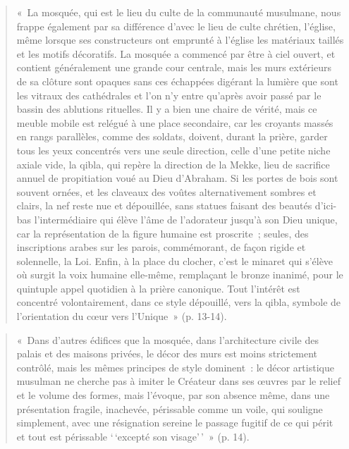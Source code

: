 \begin{quote}
    

«~La mosquée, qui est le lieu du culte de la communauté musulmane, nous
frappe également par sa différence d'avec le lieu de culte chrétien,
l'église, même lorsque ses constructeurs ont emprunté à l'église les
matériaux taillés et les motifs décoratifs. La mosquée a commencé par
être à ciel ouvert, et contient généralement une grande cour centrale,
mais les murs extérieurs de sa clôture sont opaques sans ces échappées
digérant la lumière que sont les vitraux des cathédrales et l'on n'y
entre qu'après avoir passé par le bassin des ablutions rituelles. Il y a
bien une chaire de vérité, mais ce meuble mobile est relégué à une place
secondaire, car les croyants massés en rangs parallèles, comme des
soldats, doivent, durant la prière, garder tous les yeux concentrés vers
une seule direction, celle d'une petite niche axiale vide, la qibla, qui
repère la direction de la Mekke, lieu de sacrifice annuel de
propitiation voué au Dieu d'Abraham. Si les portes de bois sont souvent
ornées, et les claveaux des voûtes alternativement sombres et clairs, la
nef reste nue et dépouillée, sans statues faisant des beautés d'ici-bas
l'intermédiaire qui élève l'âme de l'adorateur jusqu'à son Dieu unique,
car la représentation de la figure humaine est proscrite~; seules, des
inscriptions arabes sur les parois, commémorant, de façon rigide et
solennelle, la Loi. Enfin, à la place du clocher, c'est le minaret qui
s'élève où surgit la voix humaine elle-même, remplaçant le bronze
inanimé, pour le quintuple appel quotidien à la prière canonique. Tout
l'intérêt est concentré volontairement, dans ce style dépouillé, vers la
qibla, symbole de l'orientation du cœur vers l'Unique~» (p. 13-14).
\end{quote}
\begin{quote}
    
«~Dans d'autres édifices que la mosquée, dans l'architecture civile des
palais et des maisons privées, le décor des murs est moins strictement
contrôlé, mais les mêmes principes de style dominent~: le décor
artistique musulman ne cherche pas à imiter le Créateur dans ses œuvres
par le relief et le volume des formes, mais l'évoque, par son absence
même, dans une présentation fragile, inachevée, périssable comme un
voile, qui souligne simplement, avec une résignation sereine le passage
fugitif de ce qui périt et tout est périssable `\,`excepté son
visage'\,'~» (p. 14).
\end{quote}

